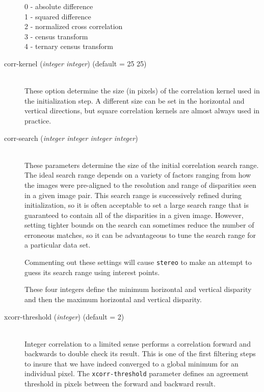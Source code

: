 \begin{description}
  \begin{description}
    \item[0 - absolute difference]
    \item[1 - squared difference]
    \item[2 - normalized cross correlation]
    \item[3 - census transform]
    \item[4 - ternary census transform]
  \end{description}

\item[corr-kernel \textnormal{\small{(\emph{integer integer})}} (default = 25 25)] \hfill \\
  These option determine the size (in pixels) of the correlation
  kernel used in the initialization step.  A different size can be set
  in the horizontal and vertical directions, but square correlation
  kernels are almost always used in practice.

\item[corr-search \textnormal{\small{(\emph{integer integer integer integer})}}] \hfill \\
  These parameters determine the size of the initial correlation
  search range.  The ideal search range depends on a variety of
  factors ranging from how the images were pre-aligned to the
  resolution and range of disparities seen in a given image pair.
  This search range is successively refined during initialization, so
  it is often acceptable to set a large search range that is guaranteed
  to contain all of the disparities in a given image.  However,
  setting tighter bounds on the search can sometimes reduce the number
  of erroneous matches, so it can be advantageous to tune the
  search range for a particular data set.

  Commenting out these settings will cause \texttt{stereo} to make an
  attempt to guess its search range using interest points.

  These four integers define the minimum horizontal and
  vertical disparity and then the maximum horizontal and vertical
  disparity.

\item[xcorr-threshold \textnormal{\small{(\emph{integer})}} (default = 2)] \hfill \\

  Integer correlation to a limited sense performs a correlation
  forward and backwards to double check its result. This is one of the
  first filtering steps to insure that we have indeed converged to a
  global minimum for an individual pixel. The \texttt{xcorr-threshold}
  parameter defines an agreement threshold in pixels between the
  forward and backward result.


\end{description}
